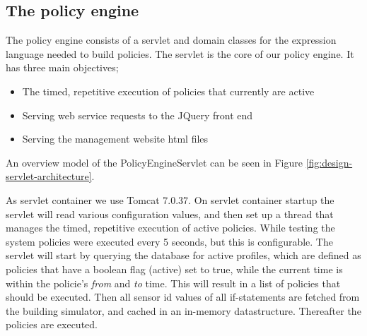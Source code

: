 
\subsection{The policy engine}
The policy engine consists of a servlet and domain classes for the expression language needed to build policies. The servlet is the core of our policy engine. It has three main objectives;

\begin{figure}[b]
\end{figure}

\begin{itemize}
	\item The timed, repetitive execution of policies that currently are active
	\item Serving web service requests to the JQuery front end
	\item Serving the management website html files
\end{itemize}

An overview model of the PolicyEngineServlet can be seen in Figure \ref{fig:design-servlet-architecture}.

As servlet container we use Tomcat 7.0.37. On servlet container startup the servlet will read various configuration values, and then set up a thread that manages the timed, repetitive execution of active policies. While testing the system policies were executed every 5 seconds, but this is configurable. The servlet will start by querying the database for active profiles, which are defined as policies that have a boolean flag (active) set to true, while the current time is within the policie's \textit{from} and \textit{to} time. This will result in a list of policies that should be executed. Then all sensor id values of all if-statements are fetched from the building simulator, and cached in an in-memory datastructure. Thereafter the policies are executed. 


